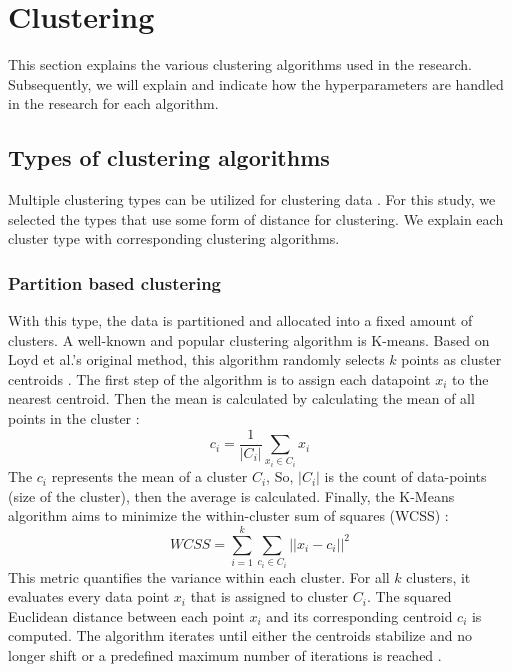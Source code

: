 \section{Clustering}
This section explains the various clustering algorithms used in the research.
Subsequently, we will explain and indicate how the hyperparameters are handled in the research for each algorithm.
\subsection{Types of clustering algorithms}
Multiple clustering types can be utilized for clustering data \citep{xu_comprehensive_2015}.
For this study, we selected the types that use some form of distance for clustering.
We explain each cluster type with corresponding clustering algorithms.
\subsubsection{Partition based clustering}
With this type, the data is partitioned and allocated into a fixed amount of clusters.
A well-known and popular clustering algorithm is K-means.
Based on Loyd et al.'s original method, this algorithm randomly selects $k$ points as cluster centroids \citep{1056489}.
The first step of the algorithm is to assign each datapoint $x_i$ to the nearest centroid.
Then the mean is calculated by calculating the mean of all points in the cluster \citep{yuan_research_2019}:
\begin{equation}
    c_i = \frac{1}{|C_i|} \sum_{x_i \in C_i} x_i
\end{equation}
The $c_i$ represents the mean of a cluster $C_i$,
So, $|C_i|$ is the count of data-points (size of the cluster), then the average is calculated.
Finally, the K-Means algorithm aims to minimize the within-cluster sum of squares (WCSS) \citep{yuan_research_2019}:
\begin{equation}
    WCSS = \sum_{i=1}^{k} \sum_{c_i \in C_i} || x_i - c_i ||^2
\end{equation}
This metric quantifies the variance within each cluster. For all \( k \) clusters, it evaluates every data point \( x_i \) that is assigned to cluster \( C_i \). 
The squared Euclidean distance between each point \( x_i \) and its corresponding centroid \( c_i \) is computed. 
The algorithm iterates until either the centroids stabilize and no longer shift or a predefined maximum number of iterations is reached \citep{yuan_research_2019}.

